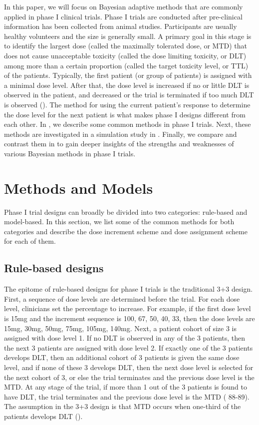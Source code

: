 \documentclass[12pt]{article}
\begin{document}
In this paper, we will focus on Bayesian adaptive methods that are commonly applied in phase I clinical trials.
Phase I trials are conducted after pre-clinical information has been collected from animal studies.
Participants are usually healthy volunteers and the size is generally small.
A primary goal in this stage is to identify the largest dose (called the maximally tolerated dose, or MTD) that does not cause unacceptable toxicity (called the dose limiting toxicity, or DLT) among more than a certain proportion (called the target toxicity level, or TTL) of the patients.
Typically, the first patient (or group of patients) is assigned with a minimal dose level.
After that, the dose level is increased if no or little DLT is observed in the patient, and decreased or the trial is terminated if too much DLT is observed (\cite{friedman}).
The method for using the current patient's response to determine the dose level for the next patient is what makes phase I designs different from each other.
In , we describe some common methods in phase I trials.
Next, these methods are investigated in a simulation study in .
Finally, we compare and contrast them in  to gain deeper insights of the strengths and weaknesses of various Bayesian methods in phase I trials.

\section{Methods and Models} \label{secMeth}

Phase I trial designs can broadly be divided into two categories: rule-based and model-based.
In this section, we list some of the common methods for both categories and describe the dose increment scheme and dose assignment scheme for each of them.

\subsection{Rule-based designs}

The epitome of rule-based designs for phase I trials is the traditional 3+3 design.
First, a sequence of dose levels are determined before the trial.
For each dose level, clinicians set the percentage to increase.
For example, if the first dose level is 15mg and the increment sequence is 100, 67, 50, 40, 33,
then the dose levels are 15mg, 30mg, 50mg, 75mg, 105mg, 140mg.
Next, a patient cohort of size 3 is assigned with dose level 1.
If no DLT is observed in any of the 3 patients, then the next 3 patients are assigned with dose level 2.
If exactly one of the 3 patients develops DLT,
then an additional cohort of 3 patients is given the same dose level,
and if none of these 3 develops DLT, then the next dose level is selected for the next cohort of 3,
or else the trial terminates and the previous dose level is the MTD.
At any stage of the trial,
if more than 1 out of the 3 patients is found to have DLT,
the trial terminates and the previous dose level is the MTD (\cite{berry} 88-89).
The assumption in the 3+3 design is that MTD occurs when one-third of the patients develops DLT (\cite{friedman}).
\end{document}
